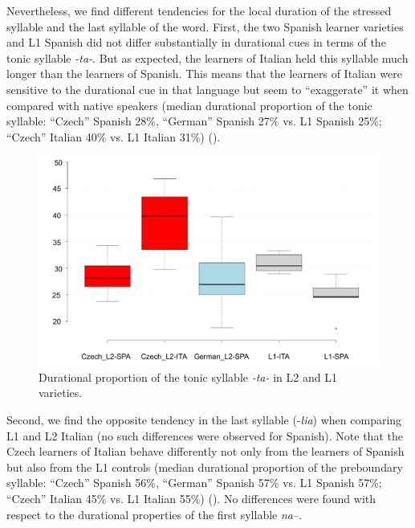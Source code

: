 Nevertheless, we find different tendencies for the local duration of the stressed syllable and the last syllable of the word. First, the two Spanish learner varieties and L1 Spanish did not differ substantially in durational cues in terms of the tonic syllable \textit{{}-ta-}. But as expected, the learners of Italian held this syllable much longer than the learners of Spanish. This means that the learners of Italian were sensitive to the durational cue in that language but seem to “exaggerate” it when compared with native speakers (median durational proportion of the tonic syllable: “Czech” Spanish 28\%, “German” Spanish 27\% vs. L1 Spanish 25\%; “Czech” Italian 40\% vs. L1 Italian 31\%) ().

\begin{figure}


\includegraphics[width=\textwidth]{figures/Figure_148.pdf}



\caption{Durational proportion of the tonic syllable \textit{{}-ta-} in L2 and L1 varieties.}
\label{fig:4.148}
\end{figure}

Second, we find the opposite tendency in the last syllable (-\textit{lia}) when comparing L1 and L2 Italian (no such differences were observed for Spanish). Note that the Czech learners of Italian behave differently not only from the learners of Spanish but also from the L1 controls (median durational proportion of the preboundary syllable: “Czech” Spanish 56\%, “German” Spanish 57\% vs. L1 Spanish 57\%; “Czech” Italian 45\% vs. L1 Italian 55\%) (). No differences were found with respect to the durational properties of the first syllable \textit{na–}.

